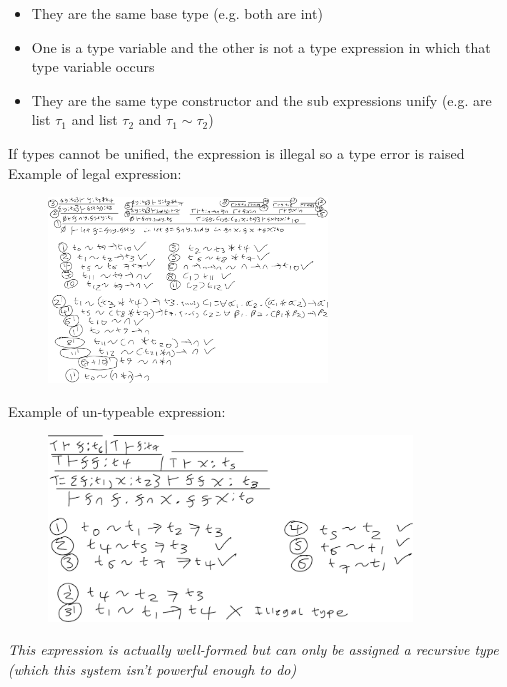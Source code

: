 \documentclass[20pt,a4paper,landscape]{extarticle}
\begin{document}
\begin{flushleft}
\begin{itemize}
\item They are the same base type (e.g. both are int)
\item One is a type variable and the other is not a type expression in which that type variable occurs
\item They are the same type constructor and the sub expressions unify (e.g. are list $\tau_1$ and list $\tau_2$ and $\tau_1 \sim \tau_2$)
\end{itemize}
If types cannot be unified, the expression is illegal so a type error is raised
\clearpage
Example of legal expression:
\FloatBarrier
\begin{figure}[h]
\begin{center}
\includegraphics[width=0.66\textwidth]{meta/cs349/HTMI_Example4.pdf}{}
\end{center}
\end{figure}
\clearpage
Example of un-typeable expression:
\begin{figure}[h]
\begin{center}
\includegraphics[width=0.86\textwidth]{meta/cs349/HTMI_Example2.pdf}{}
\end{center}
\end{figure}
\FloatBarrier
\textit{This expression is actually well-formed but can only be assigned a recursive type (which this system isn't powerful enough to do)}\\

\end{flushleft}
\end{document}

